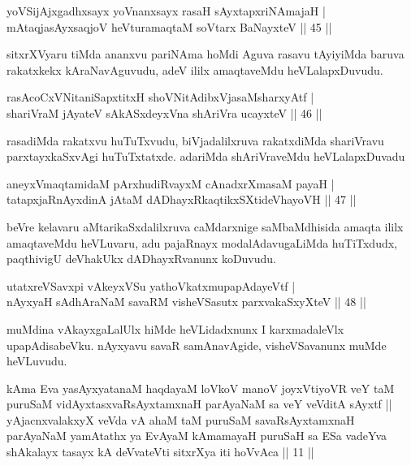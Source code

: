 \begin{shl}
yoVSijAjxgadhxsayx yoVnanxsayx rasaH sAyxtapxriNAmajaH |\\
mAtaqjasAyxsaqjoV heVturamaqtaM soV\s tarx BaNayxteV \hfill || 45 ||
\end{shl}

\begin{artha}
sitxrXVyaru tiMda ananxvu pariNAma hoMdi Aguva rasavu tAyiyiMda baruva rakatxkekx kAraNavAguvudu, adeV ililx amaqtaveMdu heVLalapxDuvudu.
\end{artha}

\begin{shl}
rasAcoCxVNitaniSapxtitxH shoVNitAdibxVjasaMsharxyAtf |\\
shariVraM jAyateV sAkASxdeyxVna shAriVra ucayxteV \hfill || 46 ||
\end{shl}

\begin{artha}
rasadiMda rakatxvu huTuTxvudu, biVjadalilxruva rakatxdiMda shariVravu parxtayxkaSxvAgi huTuTxtatxde. adariMda shAriVraveMdu heVLalapxDuvadu 
\end{artha}

\begin{shl}
aneyxV\s maqtamidaM pArxhudiRvayxM cAnadxrXmasaM payaH |\\
tatapxjaRnAyxdinA jAtaM dADhayxRkaqtikxSXtideVhayoVH \hfill || 47 ||
\end{shl}

\begin{artha}%
beVre kelavaru aMtarikaSxdalilxruva caMdarxnige saMbaMdhisida amaqta ililx amaqtaveMdu heVLuvaru, adu pajaRnayx modalAdavugaLiMda huTiTxdudx, paqthivigU deVhakUkx dADhayxRvanunx koDuvudu.
\end{artha}

\begin{shl}
utatxreVSavxpi vAkeyxVSu yathoVkatxmupapAdayeVtf |\\
nAyxyaH sAdhAraNaM savaRM visheVSasutx parxvakaSxyXteV \hfill || 48 ||
\end{shl}

\begin{artha}
muMdina vAkayxgaLalUlx hiMde heVLidadxnunx I karxmadaleVlx upapAdisabeVku. nAyxyavu savaR samAnavAgide, visheVSavanunx muMde heVLuvudu.
\end{artha}


\begin{kandikeshl}
kAma Eva yasAyxyatanaM haqdayaM loVkoV manoV joyxVtiyoVR veY taM puruSaM vidAyxtasxvaRsAyxtamxnaH parAyaNaM sa veY veVditA sAyxtf || yAjacnxvalakxyX veVda vA ahaM taM puruSaM savaRsAyxtamxnaH parAyaNaM yamAtathx ya EvAyaM kAmamayaH puruSaH sa ESa vadeYva shAkalayx tasayx kA deVvateVti sitxrXya iti hoVvAca || 11 ||
\end{kandikeshl}

